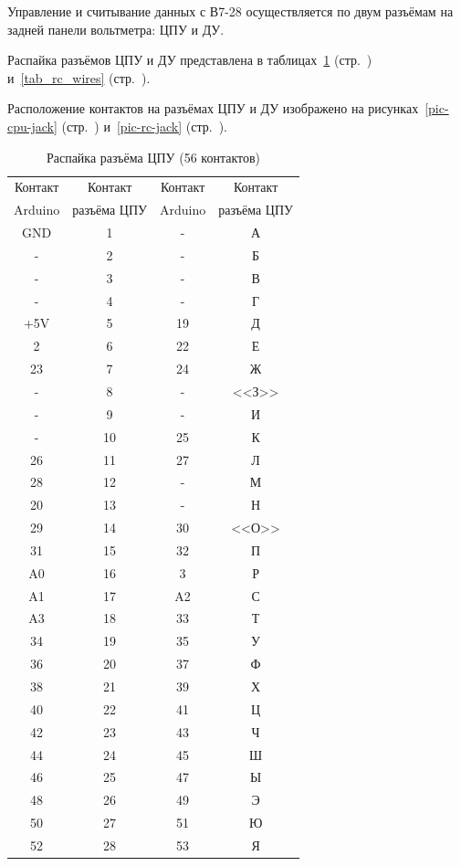 \documentclass[12pt, a4paper]{article}
\newcommand{\V}{\mbox{В7-28}}
\begin{document}
Управление и считывание данных с {\V} осуществляется по двум разъёмам на задней панели вольтметра: ЦПУ и ДУ.

Распайка разъёмов ЦПУ и ДУ представлена в таблицах~\ref{tab_cpu_wires} (стр.~\pageref{tab_cpu_wires}) и~\ref{tab_rc_wires} (стр.~\pageref{tab_rc_wires}).

Расположение контактов на разъёмах ЦПУ и ДУ изображено на рисунках~\ref{pic-cpu-jack} (стр.~\pageref{pic-cpu-jack}) и~\ref{pic-rc-jack} (стр.~\pageref{pic-rc-jack}).

\begin{table}
\begin{center}
\caption{Распайка разъёма ЦПУ (56 контактов)}
\begin{tabular}{cccc}
\hline \hline
Контакт & Контакт & Контакт & Контакт \\
Arduino & разъёма ЦПУ & Arduino & разъёма ЦПУ \\
\hline
GND & 1 & - & А \\
- & 2 & - & Б \\
- & 3 & - & В \\
- & 4 & - & Г \\
+5V & 5 & 19 & Д \\
2 & 6 & 22 & Е \\
23 & 7 & 24 & Ж \\
- & 8 & - & <<З>> \\
- & 9 & - & И \\
- & 10 & 25 & К \\
26 & 11 & 27 & Л \\
28 & 12 & - & М \\
20 & 13 & - & Н \\
29 & 14 & 30 & <<О>> \\
31 & 15 & 32 & П \\
A0 & 16 & 3 & Р \\
A1 & 17 & A2 & С \\
A3 & 18 & 33 & Т \\
34 & 19 & 35 & У \\
36 & 20 & 37 & Ф \\
38 & 21 & 39 & Х \\
40 & 22 & 41 & Ц \\
42 & 23 & 43 & Ч \\
44 & 24 & 45 & Ш \\
46 & 25 & 47 & Ы \\
48 & 26 & 49 & Э \\
50 & 27 & 51 & Ю \\
52 & 28 & 53 & Я \\
\hline \hline
\end{tabular}
\label{tab_cpu_wires}
\end{center}
\end{table}
\end{document}
